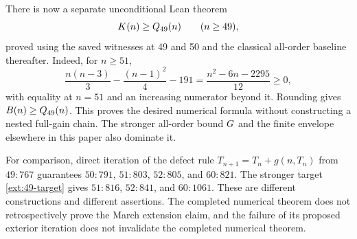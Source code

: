 There is now a separate unconditional Lean theorem
\begin{equation}
 K(n)\geq Q_{49}(n)\qquad(n\geq49),
 \label{ext:49-unconditional}
\end{equation}
proved using the saved witnesses at 49 and 50 and the classical all-order
baseline thereafter.  Indeed, for $n\geq51$,
\[
 \frac{n(n-3)}3-\frac{(n-1)^2}4-191
 =\frac{n^2-6n-2295}{12}\geq0,
\]
with equality at $n=51$ and an increasing numerator beyond it.  Rounding
gives $B(n)\geq Q_{49}(n)$.  This proves the desired numerical formula
without constructing a nested full-gain chain.  The stronger all-order
bound $G$ and the finite envelope elsewhere in this paper also dominate
it.

For comparison, direct iteration of the defect rule
$T_{n+1}=T_n+g(n,T_n)$ from $49:767$ guarantees
$50:791$, $51:803$, $52:805$, and $60:821$.
The stronger target \eqref{ext:49-target} gives $51:816$, $52:841$, and
$60:1061$.  These are different constructions and different assertions.
The completed numerical theorem does not retrospectively prove the
March extension claim, and the failure of its proposed exterior
iteration does not invalidate the completed numerical theorem.
